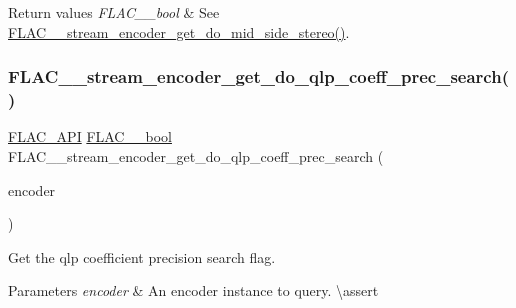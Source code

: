 \begin{DoxyRetVals}{Return values}
{\em F\+L\+A\+C\+\_\+\+\_\+bool} & See \mbox{\hyperlink{group__flac__stream__encoder_ga3308e73db9d0ae4803485c35d2a54a2d}{F\+L\+A\+C\+\_\+\+\_\+stream\+\_\+encoder\+\_\+get\+\_\+do\+\_\+mid\+\_\+side\+\_\+stereo()}}. \\
\hline
\end{DoxyRetVals}
\mbox{\label{group__flac__stream__encoder_gaa258ce03d970b397f5b698c63636d985}} 
\subsubsection{\texorpdfstring{FLAC\_\_stream\_encoder\_get\_do\_qlp\_coeff\_prec\_search()}{FLAC\_\_stream\_encoder\_get\_do\_qlp\_coeff\_prec\_search()}}
{\footnotesize\ttfamily \mbox{\hyperlink{group__flac__export_ga56ca07df8a23310707732b1c0007d6f5}{F\+L\+A\+C\+\_\+\+A\+PI}} \mbox{\hyperlink{ordinals_8h_a95103469f1cbd78b8cf250194985b34e}{F\+L\+A\+C\+\_\+\+\_\+bool}} F\+L\+A\+C\+\_\+\+\_\+stream\+\_\+encoder\+\_\+get\+\_\+do\+\_\+qlp\+\_\+coeff\+\_\+prec\+\_\+search (\begin{DoxyParamCaption}\item[{const \mbox{\hyperlink{struct_f_l_a_c_____stream_encoder}{F\+L\+A\+C\+\_\+\+\_\+\+Stream\+Encoder}} $\ast$}]{encoder }\end{DoxyParamCaption})}

Get the qlp coefficient precision search flag.


\begin{DoxyParams}{Parameters}
{\em encoder} & An encoder instance to query. \textbackslash{}assert 
\begin{DoxyCode}{1}
\end{DoxyCode}
 \\
\hline
\end{DoxyParams}

